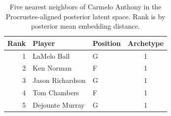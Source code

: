 \begin{table}[htbp]
  \centering\small
  \begin{tabular}{rllc}
    \toprule
    Rank & Player & Position & Archetype \\
    \midrule
    1 & LaMelo Ball & G & 1 \\
    2 & Ken Norman & F & 1 \\
    3 & Jason Richardson & G & 1 \\
    4 & Tom Chambers & F & 1 \\
    5 & Dejounte Murray & G & 1 \\
    \bottomrule
  \end{tabular}
  \caption{Five nearest neighbors of Carmelo Anthony in the Procrustes-aligned posterior latent space. Rank is by posterior mean embedding distance.}
  \label{tab:Carmelo_Anthony_neighbors}
\end{table}

